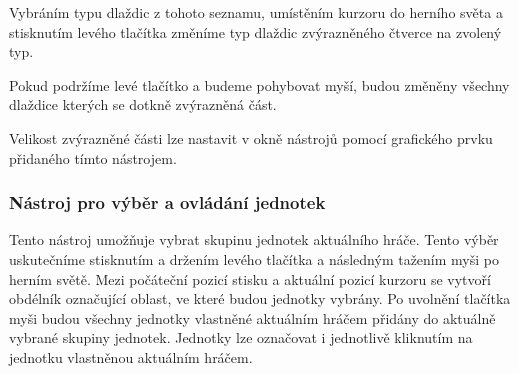 \medskip
{}

\medskip
{}

\medskip
{}

\medskip
{}

\medskip
{}

\bigskip

Vybráním typu dlaždic z tohoto seznamu, umístěním kurzoru do herního světa a stisknutím levého tlačítka změníme typ dlaždic zvýrazněného čtverce na zvolený typ.

Pokud podržíme levé tlačítko a budeme pohybovat myší, budou změněny všechny dlaždice kterých se dotkně zvýrazněná část.

Velikost zvýrazněné části lze nastavit v okně nástrojů pomocí grafického prvku přidaného tímto nástrojem.

\subsubsection{Nástroj pro výběr a ovládání jednotek}
Tento nástroj umožňuje vybrat skupinu jednotek aktuálního hráče. Tento výběr uskutečníme stisknutím a držením levého tlačítka a následným tažením myši po herním světě. Mezi počáteční pozicí stisku a aktuální pozicí kurzoru se vytvoří obdélník označující oblast, ve které budou jednotky vybrány. Po uvolnění tlačítka myši budou všechny jednotky vlastněné aktuálním hráčem přidány do aktuálně vybrané skupiny jednotek. Jednotky lze označovat i jednotlivě kliknutím na jednotku vlastněnou aktuálním hráčem.

